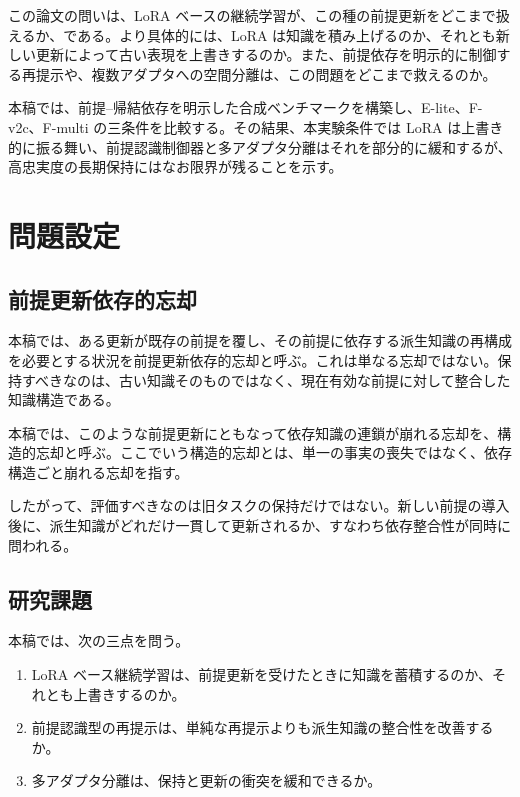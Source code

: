 \documentclass[12pt,a4paper]{article}
\begin{document}
この論文の問いは、LoRA ベースの継続学習が、この種の前提更新をどこまで扱えるか、である。より具体的には、LoRA は知識を積み上げるのか、それとも新しい更新によって古い表現を上書きするのか。また、前提依存を明示的に制御する再提示や、複数アダプタへの空間分離は、この問題をどこまで救えるのか。

本稿では、前提--帰結依存を明示した合成ベンチマークを構築し、E-lite、F-v2c、F-multi の三条件を比較する。その結果、本実験条件では LoRA は上書き的に振る舞い、前提認識制御器と多アダプタ分離はそれを部分的に緩和するが、高忠実度の長期保持にはなお限界が残ることを示す。

\section{問題設定}

\subsection{前提更新依存的忘却}

本稿では、ある更新が既存の前提を覆し、その前提に依存する派生知識の再構成を必要とする状況を前提更新依存的忘却と呼ぶ。これは単なる忘却ではない。保持すべきなのは、古い知識そのものではなく、現在有効な前提に対して整合した知識構造である。

本稿では、このような前提更新にともなって依存知識の連鎖が崩れる忘却を、構造的忘却と呼ぶ。ここでいう構造的忘却とは、単一の事実の喪失ではなく、依存構造ごと崩れる忘却を指す。

したがって、評価すべきなのは旧タスクの保持だけではない。新しい前提の導入後に、派生知識がどれだけ一貫して更新されるか、すなわち依存整合性が同時に問われる。

\subsection{研究課題}

本稿では、次の三点を問う。

\begin{enumerate}
  \item LoRA ベース継続学習は、前提更新を受けたときに知識を蓄積するのか、それとも上書きするのか。
  \item 前提認識型の再提示は、単純な再提示よりも派生知識の整合性を改善するか。
  \item 多アダプタ分離は、保持と更新の衝突を緩和できるか。
\end{enumerate}
\end{document}
